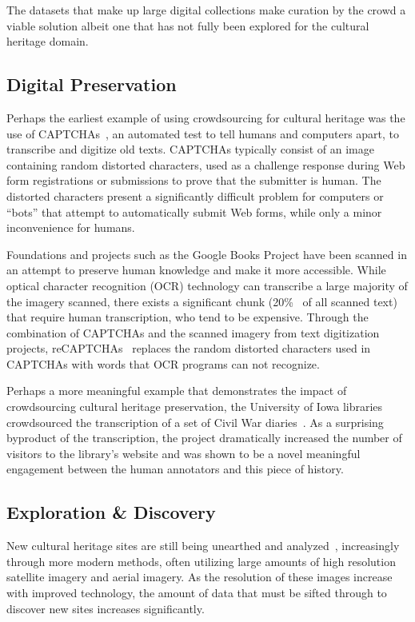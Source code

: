 \documentclass[10pt,twocolumn]{article}
\begin{document}
The datasets that make up large digital collections make curation by the crowd 
a viable solution albeit one that has not fully been explored for the cultural
heritage domain.

\subsection{Digital Preservation}

Perhaps the earliest example of using crowdsourcing for cultural heritage was
the use of CAPTCHAs~\cite{Ahn2003}, an automated test to tell humans and computers apart, to transcribe and digitize old texts. CAPTCHAs typically 
consist of an image containing random distorted characters, used as a challenge
response during Web form registrations or submissions to prove that the 
submitter is human. The distorted characters present a significantly 
difficult problem for computers or ``bots'' that attempt to automatically submit Web forms, while only a minor inconvenience for humans.

Foundations and projects such as the Google Books Project have been scanned 
in an attempt to preserve human knowledge and make it more accessible. While
optical character recognition (OCR) technology can transcribe a large majority
of the imagery scanned, there  exists a significant chunk 
(20\%~\cite{VonAhn2008a} of all scanned text) that require human transcription,
who tend to be expensive. Through the combination of CAPTCHAs and the scanned 
imagery from text digitization projects, reCAPTCHAs~\cite{VonAhn2008a} replaces 
the random distorted characters used in CAPTCHAs with words that OCR programs
can not recognize.

Perhaps a more meaningful example that demonstrates the impact of 
crowdsourcing cultural heritage preservation, the University of Iowa 
libraries crowdsourced the transcription of a set of Civil War 
diaries~\cite{Owens2013}. As a surprising byproduct of the transcription, the
project dramatically increased the number of visitors to the library's
website and was shown to be a novel meaningful engagement between the human
annotators and this piece of history.

\subsection{Exploration \& Discovery}

New cultural heritage sites are still being unearthed and 
analyzed~\cite{Lasaponara2007,Rowlands2007,Alexakis2009}, increasingly 
through more modern methods, often utilizing large amounts of
high resolution satellite imagery and aerial imagery. As the resolution of
these images increase with improved technology, the amount of data that must
be sifted through to discover new sites increases significantly.
\end{document}
